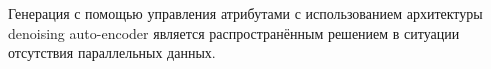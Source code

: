 Генерация с помощью управления атрибутами с использованием архитектуры denoising auto-encoder \cite{lample2018unsupervised, lample2018phrasebased, subramanian2019multipleattribute} является распространённым решением в ситуации отсутствия параллельных данных.


